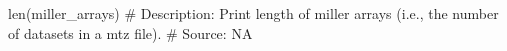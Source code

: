 len(miller_arrays)
# Description:  Print length of miller arrays (i.e., the number of datasets in a mtz file).
# Source:  NA

